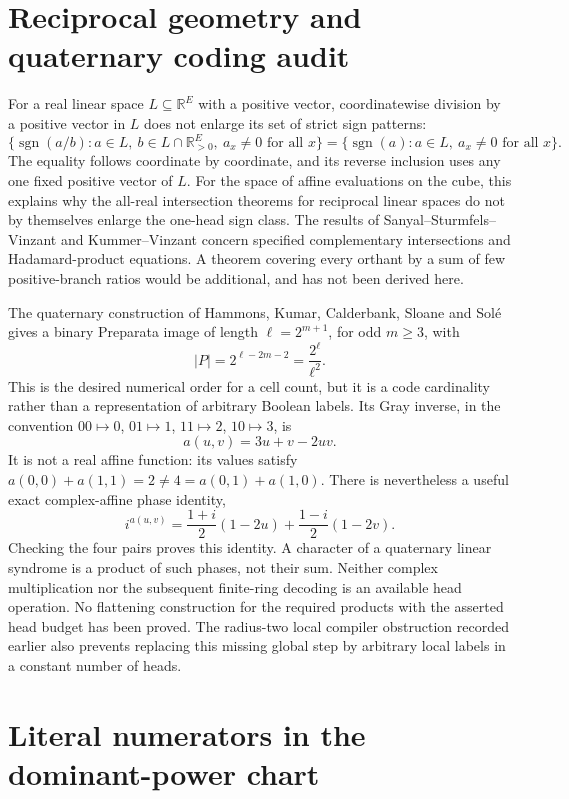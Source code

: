 \documentclass[11pt]{article}
\begin{document}
\section{Reciprocal geometry and quaternary coding audit}

For a real linear space $L\subseteq\mathbb R^E$ with a positive vector,
coordinatewise division by a positive vector in $L$ does not enlarge
its set of strict sign patterns:
\[
 \{\operatorname{sgn}(a/b):a\in L,\ b\in L\cap\mathbb R_{>0}^E,
                 \ a_x\ne0\text{ for all }x\}
 =\{\operatorname{sgn}(a):a\in L,\ a_x\ne0\text{ for all }x\}.
\]
The equality follows coordinate by coordinate, and its reverse
inclusion uses any one fixed positive vector of $L$. For the space
of affine evaluations on the cube, this explains why the all-real
intersection theorems for reciprocal linear spaces do not by
themselves enlarge the one-head sign class. The results of
Sanyal--Sturmfels--Vinzant and Kummer--Vinzant concern specified
complementary intersections and Hadamard-product equations. A theorem
covering every orthant by a sum of few positive-branch ratios would
be additional, and has not been derived here.

The quaternary construction of Hammons, Kumar, Calderbank, Sloane and
Sol\'e gives a binary Preparata image of length
$\ell=2^{m+1}$, for odd $m\geq3$, with
\[
 |P|=2^{\ell-2m-2}=\frac{2^\ell}{\ell^2}.
\]
This is the desired numerical order for a cell count, but it is a
code cardinality rather than a representation of arbitrary Boolean
labels. Its Gray inverse, in the convention
$00\mapsto0$, $01\mapsto1$, $11\mapsto2$, $10\mapsto3$, is
\[
 a(u,v)=3u+v-2uv.
\]
It is not a real affine function: its values satisfy
$a(0,0)+a(1,1)=2\ne4=a(0,1)+a(1,0)$.
There is nevertheless a useful exact complex-affine phase identity,
\[
 i^{a(u,v)}=\frac{1+i}{2}(1-2u)+\frac{1-i}{2}(1-2v).
\]
Checking the four pairs proves this identity. A character of a
quaternary linear syndrome is a product of such phases, not their
sum. Neither complex multiplication nor the subsequent finite-ring
decoding is an available head operation. No flattening construction
for the required products with the asserted head budget has been
proved. The radius-two local compiler obstruction recorded earlier
also prevents replacing this missing global step by arbitrary local
labels in a constant number of heads.

\section{Literal numerators in the dominant-power chart}
\end{document}
